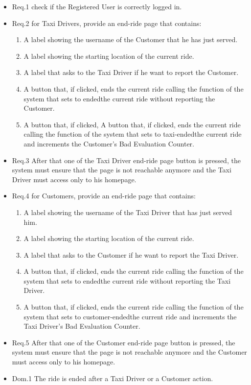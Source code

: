 				\begin{itemize}
					\item \lbrack Req.1\rbrack \label{sec:fr1_g7} check if the Registered User is correctly logged in.
					\item \lbrack Req.2\rbrack \label{sec:fr2_g7} for Taxi Drivers, provide an end-ride page that contains:
						\begin{enumerate}
							\item A label showing the username of the Customer that he has just served.
							\item A label showing the starting location of the current ride.
							\item A label that asks to the Taxi Driver if he want to report the Customer.
							\item A button that, if clicked, ends the current ride calling the function of the system that sets to \textquotedbleft ended\textquotedbright the current ride without reporting the Customer.
							\item A button that, if clicked, A button that, if clicked, ends the current ride calling the function of the system that sets to \textquotedbleft taxi-ended\textquotedbright the current ride and increments the Customer's Bad Evaluation Counter.
						\end{enumerate}
					\item \lbrack Req.3\rbrack \label{sec:fr3_g7} After that one of the Taxi Driver end-ride page button is pressed, the system must ensure that the page is not reachable anymore and the Taxi Driver must access only to his homepage.
					\\
					\item \lbrack Req.4\rbrack \label{sec:fr4_g7} for Customers, provide an end-ride page that contains:
						\begin{enumerate}
							\item A label showing the username of the Taxi Driver that has just served him.
							\item A label showing the starting location of the current ride.
							\item A label that asks to the Customer if he want to report the Taxi Driver.
							\item A button that, if clicked, ends the current ride calling the function of the system that sets to \textquotedbleft ended\textquotedbright the current ride without reporting the Taxi Driver.
							\item A button that, if clicked, ends the current ride calling the function of the system that sets to \textquotedbleft customer-ended\textquotedbright the current ride and increments the Taxi Driver's Bad Evaluation Counter.
						\end{enumerate}
					\item \lbrack Req.5\rbrack \label{sec:fr5_g7} After that one of the Customer end-ride page button is pressed, the system must ensure that the page is not reachable anymore and the Customer must access only to his homepage.
					\item \lbrack Dom.1\rbrack \label{sec:da1_g7} The ride is ended after a Taxi Driver or a Customer action.
				\end{itemize}

